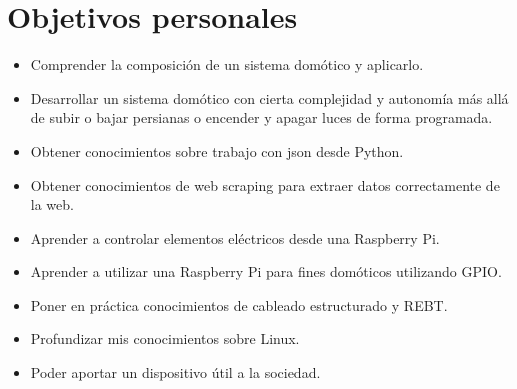 \section{Objetivos personales}
\begin{itemize}
    \item Comprender la composición de un sistema domótico y aplicarlo.
    \item Desarrollar un sistema domótico con cierta complejidad y autonomía más allá de subir o bajar persianas o encender y apagar luces de forma programada.
    \item Obtener conocimientos sobre trabajo con json desde Python.
    \item Obtener conocimientos de web scraping para extraer datos correctamente de la web.
    \item Aprender a controlar elementos eléctricos desde una Raspberry Pi.
    \item Aprender a utilizar una Raspberry Pi para fines domóticos utilizando GPIO.
    \item Poner en práctica conocimientos de cableado estructurado y REBT.
    \item Profundizar mis conocimientos sobre Linux.
    \item Poder aportar un dispositivo útil a la sociedad.
\end{itemize}
